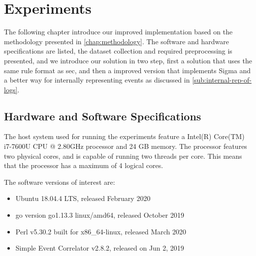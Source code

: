 \chapter{Experiments}
\label{chap:experiments}
The following chapter introduce our improved implementation based on the methodology presented in \cref{chap:methodology}. The software and hardware specifications are listed, the dataset collection and required preprocessing is presented, and we introduce our solution in two step, first a solution that uses the same rule format as \acrshort{sec}, and then a improved version that implements Sigma \cite{Sigma} and a better way for internally representing events as discussed in \cref{sub:internal-rep-of-logs}.

\iffalse
graph the dataset and look at peaks.
Then multiply by potential hosts in enterprise.
Then look at, are we able to handle that amount of events?
What if we use more rules?


The following chapter introduces the actual implementation of the experiment based on the methodology presented in Chapter 4. The collection of the data set, the software versions, the hardware
specifications and the used algorithms during the experiment are presented as well as the experimental design and the technical implementation. It demonstrates the technical execution of the
methodology for reproducibility of the use case.
\fi

\section{Hardware and Software Specifications}
\label{sec:hardwaresoftwarespecs}
The host system used for running the experiments feature a Intel(R) Core(TM) i7-7600U CPU @ 2.80GHz processor and 24 GB memory. The processor features two physical cores, and is capable of running two threads per core. This means that the processor has a maximum of 4 logical cores.

The software versions of interest are:
\begin{itemize}
    \item Ubuntu 18.04.4 LTS, released February 2020
    \item go version go1.13.3 linux/amd64, released October 2019
    \item Perl v5.30.2 built for x86\_64-linux, released March 2020
    \item Simple Event Correlator v2.8.2, released on Jun 2, 2019
\end{itemize}

